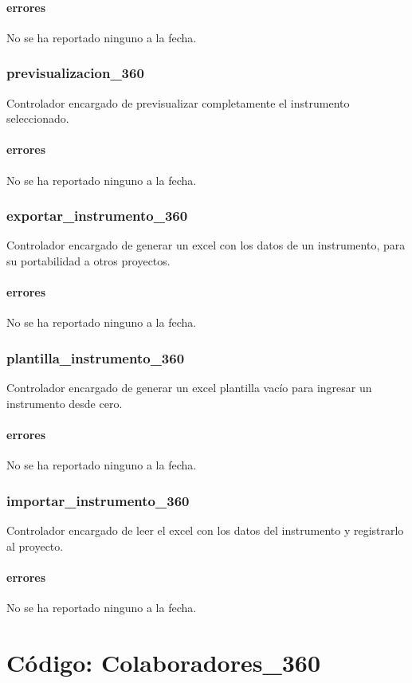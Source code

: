 \documentclass[10pt,a4paper]{book}
\begin{document}
	\subsubsection{errores}
	No se ha reportado ninguno a la fecha.

	\subsection{previsualizacion\_360}
	Controlador encargado de previsualizar completamente el instrumento seleccionado.
	\subsubsection{errores}
	No se ha reportado ninguno a la fecha.

	\subsection{exportar\_instrumento\_360}
	Controlador encargado de generar un excel con los datos de un instrumento, para su portabilidad a otros proyectos.
	\subsubsection{errores}
	No se ha reportado ninguno a la fecha.

	\subsection{plantilla\_instrumento\_360}
	Controlador encargado de generar un excel plantilla vacío para ingresar un instrumento desde cero.
	\subsubsection{errores}
	No se ha reportado ninguno a la fecha.

	\subsection{importar\_instrumento\_360}
	Controlador encargado de leer el excel con los datos del instrumento y registrarlo al proyecto.
	\subsubsection{errores}
	No se ha reportado ninguno a la fecha.


	\chapter{Código: Colaboradores\_360}
\end{document}
